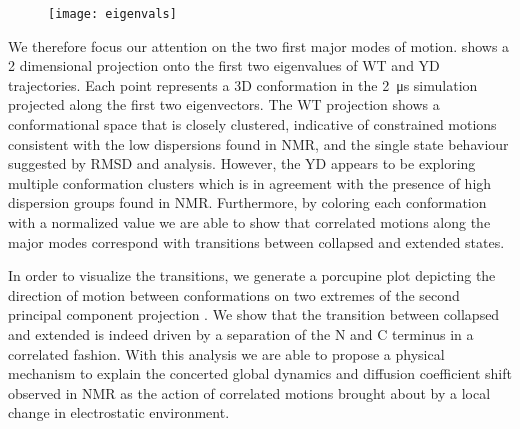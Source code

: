 \begin{figure}
\centering
	\texttt{[image: eigenvals]}
	\label{fig:eigenvalues}
\end{figure}


We therefore focus our attention on the two first major modes of motion.  shows a 2 dimensional projection onto the first two eigenvalues of WT and YD trajectories. Each point represents a 3D conformation in the \SI{2}{\us} simulation projected along the first two eigenvectors. The WT projection shows a conformational space that is closely clustered, indicative of constrained motions consistent with the low dispersions found in NMR, and the single state behaviour suggested by RMSD and \diffusion analysis. However, the YD appears to be exploring  multiple conformation clusters which is in agreement with the presence of high dispersion groups found in NMR. Furthermore, by coloring each conformation with a normalized \diffusion value we are able to show that correlated motions along the major modes correspond with transitions between collapsed and extended states. 

\begin{figure}
	\thispagestyle{empty}
	\centering     %
	\clearpage
	\label{fig:pca}
\end{figure}

In order to visualize the transitions, we generate a porcupine plot depicting the direction of motion between conformations on two extremes of the second principal component projection .  We show that the transition between collapsed and extended is indeed driven by a separation of the N and C terminus in a correlated fashion. With this analysis we are able to propose a physical mechanism to explain the concerted global dynamics and diffusion coefficient shift observed in NMR as the action of correlated motions brought about by a local change in electrostatic environment. 




